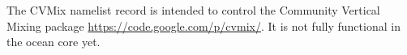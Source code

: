 The CVMix namelist record is intended to control the Community Vertical Mixing package \url{https://code.google.com/p/cvmix/}. It is not fully functional in the ocean core yet.
